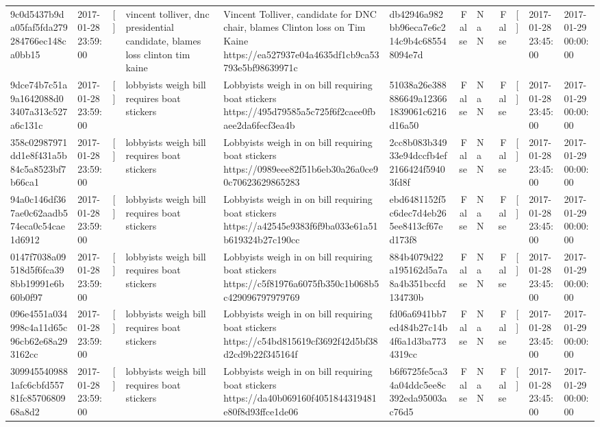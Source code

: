 \begin{tabular}{llllllrlrlll}
9c0d5437b9da05faf5fda279284766ec148ca0bb15 & 2017-01-28 23:59:00 & [] & vincent tolliver, dnc presidential candidate, blames loss clinton tim kaine & Vincent Tolliver, candidate for DNC chair, blames Clinton loss on Tim Kaine https://ea527937e04a4635df1cb9ca53793e5bf98639971c & db42946a982bb96eca7e6c214c9b4c685548094e7d & False & NaN & False & [] & 2017-01-28 23:45:00 & 2017-01-29 00:00:00 \\
9dce74b7c51a9a1642088d03407a313c527a6c131c & 2017-01-28 23:59:00 & [] & lobbyists weigh bill requires boat stickers & Lobbyists weigh in on bill requiring boat stickers https://495d79585a5c725f6f2caee0fbaee2da6fecf3ea4b & 51038a26e388886649a123661839061c6216d16a50 & False & NaN & False & [] & 2017-01-28 23:45:00 & 2017-01-29 00:00:00 \\
358c02987971dd1e8f431a5b84c5a8523bf7b66ca1 & 2017-01-28 23:59:00 & [] & lobbyists weigh bill requires boat stickers & Lobbyists weigh in on bill requiring boat stickers https://0989eee82f51b6eb30a26a0ce90c70623629865283 & 2cc8b083b34933e94dccfb4ef2166424f59403fd8f & False & NaN & False & [] & 2017-01-28 23:45:00 & 2017-01-29 00:00:00 \\
94a0c146df367ae0c62aadb574eca0c54cae1d6912 & 2017-01-28 23:59:00 & [] & lobbyists weigh bill requires boat stickers & Lobbyists weigh in on bill requiring boat stickers https://a42545e9383f6f9ba033e61a51b619324b27c190cc & ebd6481152f5c6dec7d4eb265ee8413cf67ed173f8 & False & NaN & False & [] & 2017-01-28 23:45:00 & 2017-01-29 00:00:00 \\
0147f7038a09518d5f6fca398bb19991e6b60b0f97 & 2017-01-28 23:59:00 & [] & lobbyists weigh bill requires boat stickers & Lobbyists weigh in on bill requiring boat stickers https://c5f81976a6075fb350c1b068b5c429096797979769 & 884b4079d22a195162d5a7a8a4b351bccfd134730b & False & NaN & False & [] & 2017-01-28 23:45:00 & 2017-01-29 00:00:00 \\
096e4551a034998c4a11d65c96cb62e68a293162cc & 2017-01-28 23:59:00 & [] & lobbyists weigh bill requires boat stickers & Lobbyists weigh in on bill requiring boat stickers https://c54bd815619cf3692f42d5bf38d2cd9b22f345164f & fd06a6941bb7ed484b27c14b4f6a1d3ba7734319cc & False & NaN & False & [] & 2017-01-28 23:45:00 & 2017-01-29 00:00:00 \\
3099455409881afc6cbfd55781fc8570680968a8d2 & 2017-01-28 23:59:00 & [] & lobbyists weigh bill requires boat stickers & Lobbyists weigh in on bill requiring boat stickers https://da40b069160f4051844319481e80f8d93ffce1de06 & b6f6725fe5ca34a04ddc5ee8c392eda95003ac76d5 & False & NaN & False & [] & 2017-01-28 23:45:00 & 2017-01-29 00:00:00 \\

\end{tabular}
